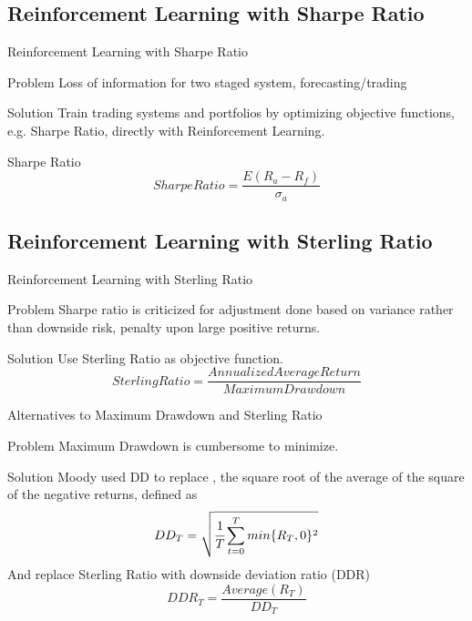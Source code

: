 \subsection{Reinforcement Learning with Sharpe Ratio}
\begin{frame}{Reinforcement Learning with Sharpe Ratio}
\begin{block}{Problem}
Loss of information for two staged system, forecasting/trading
\end{block}

\begin{block}{Solution}
Train trading systems and portfolios by optimizing objective
functions, e.g. Sharpe Ratio, directly with Reinforcement Learning.
\end{block}

\begin{block}{Sharpe Ratio}
\[ SharpeRatio = \frac{E(R_a - R_f)}{\sigma_a}\]
\end{block}
\end{frame}



\subsection{Reinforcement Learning with Sterling Ratio}
\begin{frame}{Reinforcement Learning with Sterling Ratio}
\begin{block}{Problem}
Sharpe ratio is criticized for adjustment done based on variance rather than downside risk, \alert {penalty upon large positive returns}.
\end{block}
\begin{block}{Solution}
Use Sterling Ratio as objective function.
\[
Sterling Ratio=\frac{Annualized Average Return}{Maximum Drawdown}
\]
\end{block}

\end{frame}

\begin{frame}{Alternatives to Maximum Drawdown and  Sterling Ratio}
\begin{block}{Problem}
Maximum Drawdown is cumbersome to minimize.
\end{block}

\begin{block}{Solution}
Moody used DD to replace , the square root of the average of the
square of the negative returns, defined as
\[
DD_T = \sqrt{\cfrac{1}{T}\sum_{t=0}^{T}{min\{R_T,0\}^2}}
\]
And replace Sterling Ratio with downside deviation ratio (DDR)
\[
DDR_T = \frac{Average(R_T)}{DD_T}
\]
\end{block}
\end{frame}



